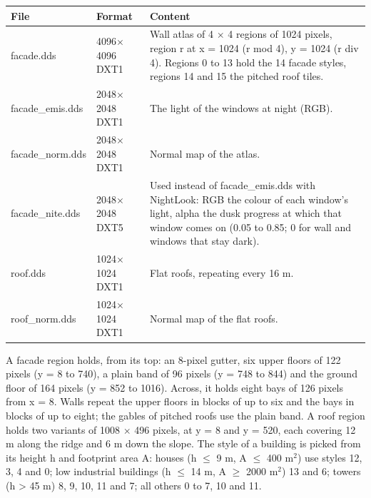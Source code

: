 \documentclass[Orbiter Developer Manual.tex]{subfiles}
\begin{document}
\begin{sloppypar}
	\begin{longtable}{ |p{}|p{}|p{}| }
	\hline\rule{0pt}{2ex}
	\textbf{File} & \textbf{Format} & \textbf{Content}\\
	\hline\rule{0pt}{2ex}
	facade.dds & 4096$\times$4096 DXT1 & Wall atlas of 4 $\times$ 4 regions of 1024 pixels, region r at x = 1024 (r mod 4), y = 1024 (r div 4). Regions 0 to 13 hold the 14 facade styles, regions 14 and 15 the pitched roof tiles.\\
	\hline\rule{0pt}{2ex}
	facade\_emis.dds & 2048$\times$2048 DXT1 & The light of the windows at night (RGB).\\
	\hline\rule{0pt}{2ex}
	facade\_norm.dds & 2048$\times$2048 DXT1 & Normal map of the atlas.\\
	\hline\rule{0pt}{2ex}
	facade\_nite.dds & 2048$\times$2048 DXT5 & Used instead of facade\_emis.dds with NightLook: RGB the colour of each window's light, alpha the dusk progress at which that window comes on (0.05 to 0.85; 0 for wall and windows that stay dark).\\
	\hline\rule{0pt}{2ex}
	roof.dds & 1024$\times$1024 DXT1 & Flat roofs, repeating every 16 m.\\
	\hline\rule{0pt}{2ex}
	roof\_norm.dds & 1024$\times$1024 DXT1 & Normal map of the flat roofs.\\
	\hline
	\end{longtable}

\noindent
A facade region holds, from its top: an 8-pixel gutter, six upper floors of 122 pixels (y = 8 to 740), a plain band of 96 pixels (y = 748 to 844) and the ground floor of 164 pixels (y = 852 to 1016). Across, it holds eight bays of 126 pixels from x = 8. Walls repeat the upper floors in blocks of up to six and the bays in blocks of up to eight; the gables of pitched roofs use the plain band. A roof region holds two variants of 1008 $\times$ 496 pixels, at y = 8 and y = 520, each covering 12 m along the ridge and 6 m down the slope. The style of a building is picked from its height h and footprint area A: houses (h $\leq$ 9 m, A $\leq$ 400 m$^2$) use styles 12, 3, 4 and 0; low industrial buildings (h $\leq$ 14 m, A $\geq$ 2000 m$^2$) 13 and 6; towers (h > 45 m) 8, 9, 10, 11 and 7; all others 0 to 7, 10 and 11.


\end{sloppypar}
\end{document}
